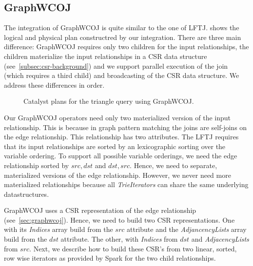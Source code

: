\subsection{GraphWCOJ} \label{subsec:spark-integration-graphWCOJ}
The integration of GraphWCOJ is quite similar to the one of \textsc{LFTJ}.
 shows the logical and physical plan constructred by our integration.
There are three main difference: GraphWCOJ requires only two children for the input relationships, the children materialize the input
relationships in a CSR data structure (see~\cref{subsec:csr-background}) and we support parallel execution of the join (which requires
a third child) and broadcasting of the CSR data structure.
We address these differences in order.

\begin{figure}
    \caption{Catalyst plans for the triangle query using GraphWCOJ.}
    \label{fig:graphWCOJ-catalyst-plan}
\end{figure}

Our GraphWCOJ operators need only two materialized version of the input relationship.
This is because in graph pattern matching the joins are self-joins on the edge relationship.
This relationship has two attributes.
The \textsc{LFTJ} requires that its input relationships are sorted by an lexicographic sorting over the variable ordering.
To support all possible variable orderings, we need the edge relationship sorted by $src, dst$ and $dst, src$.
Hence, we need to separate, materialized versions of the edge relationship.
However, we never need more materialized relationships because all \textit{TrieIterators} can share the same underlying datastructures.

GraphWCOJ uses a CSR representation of the edge relationship (see~\cref{sec:graphwcoj}).
Hence, we need to build two CSR representations.
One with its \textit{Indices} array build from the $src$ attribute and the \textit{AdjancencyLists} array build from the $dst$ attribute.
The other, with \textit{Indices} from $dst$ and \textit{AdjacencyLists} from $src$.
Next, we describe how to build these CSR's from two linear, sorted, row wise iterators as provided by Spark for the two child relationships.

